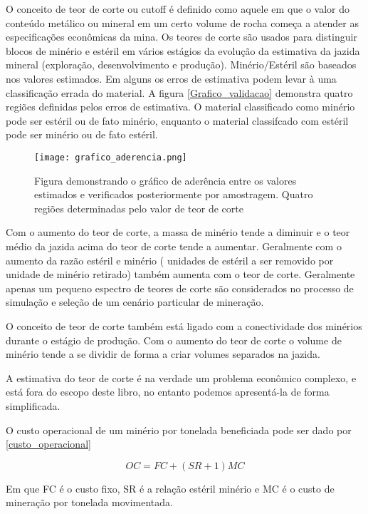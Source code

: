 O conceito de teor de corte ou cutoff é definido como aquele em que o valor do conteúdo metálico ou mineral em um certo volume de rocha começa a atender as especificações econômicas da mina. Os teores de corte são usados para distinguir blocos de minério e estéril em vários estágios da evolução da estimativa da jazida mineral (exploração, desenvolvimento e produção). Minério/Estéril são baseados nos valores estimados. Em alguns os erros de estimativa podem levar à uma classificação errada do material. A figura \eqref{Grafico_validacao} demonstra quatro regiões definidas pelos erros de estimativa. O material classificado como minério pode ser estéril ou de fato minério, enquanto o material classifcado com estéril pode ser minério ou  de fato estéril.   

\begin{figure}[H]
	\centering
	\texttt{[image: grafico\_aderencia.png]}	
	\caption{Figura demonstrando o gráfico de aderência entre os valores estimados e verificados posteriormente por amostragem. Quatro regiões determinadas pelo valor de teor de corte }
	\label{Grafico_validacao}
\end{figure}

Com o aumento do teor de corte, a massa de minério tende a diminuir e o teor médio da jazida acima do teor de corte tende a aumentar. Geralmente com o aumento da razão estéril e minério ( unidades de estéril a ser removido por unidade de minério retirado) também aumenta com o teor de corte. Geralmente apenas um pequeno espectro de teores de corte são considerados no processo de simulação e seleção de um cenário particular de mineração. 

O conceito de teor de corte também está ligado com a conectividade dos minérios durante o estágio de produção. Com o aumento do teor de corte o volume de minério tende a se dividir de forma a criar volumes separados na jazida. 

A estimativa do teor de corte é na verdade um problema econômico complexo, e está fora do escopo deste libro, no entanto podemos apresentá-la de forma simplificada. 

O custo operacional de um minério por tonelada beneficiada pode ser dado por \eqref{custo_operacional}

\begin{equation}\label{custo_operacional}
OC = FC + (SR +1 )MC
\end{equation}

Em que FC é o custo fixo, SR é a relação estéril minério e MC é o custo de mineração por tonelada movimentada. 

